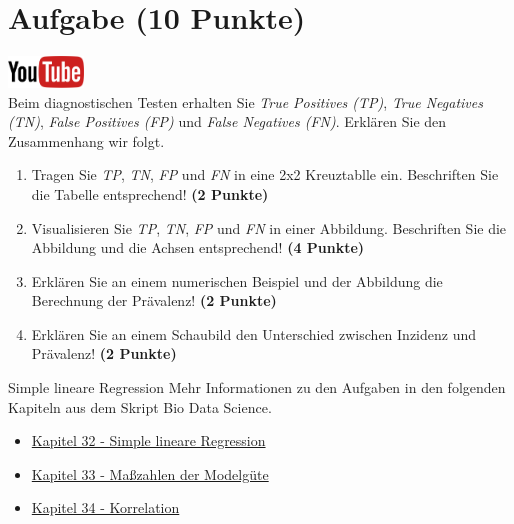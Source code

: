\documentclass[a4paper, 10pt]{scrartcl}\usepackage[]{graphicx}\usepackage[]{xcolor}
\begin{document}
 
\clearpage

\section{Aufgabe \hfill (10 Punkte)}

\hfill\href{https://youtu.be/G-_r2KplGTI}{\includegraphics[width =
  2cm]{img/youtube}}\\[1Ex]


Beim diagnostischen Testen erhalten Sie \textit{True Positives (TP)},
\textit{True Negatives (TN)}, \textit{False Positives (FP)} und
\textit{False Negatives (FN)}. Erkl{\"a}ren Sie den Zusammenhang wir folgt.

\begin{enumerate}
\item Tragen Sie \textit{TP}, \textit{TN}, \textit{FP} und \textit{FN} in
  eine 2x2 Kreuztablle ein. Beschriften Sie die Tabelle entsprechend!
  \textbf{(2 Punkte)}
\item Visualisieren Sie \textit{TP}, \textit{TN}, \textit{FP} und
  \textit{FN} in einer Abbildung. Beschriften Sie die Abbildung und die
  Achsen entsprechend! \textbf{(4 Punkte)}
\item Erkl{\"a}ren Sie an einem numerischen Beispiel und der Abbildung die
  Berechnung der Pr{\"a}valenz!  \textbf{(2 Punkte)}
\item Erkl{\"a}ren Sie an einem Schaubild den Unterschied zwischen Inzidenz und
  Pr{\"a}valenz!  \textbf{(2 Punkte)}
\end{enumerate}





 
\clearpage
\begin{graybox}{Simple lineare Regression}
Mehr Informationen zu den Aufgaben in den folgenden Kapiteln aus dem Skript Bio Data Science.
  \begin{itemize}
  \item \href{https://jkruppa.github.io/stat-linear-reg-basic.html}{Kapitel 32 - Simple lineare Regression}
  \item \href{https://jkruppa.github.io/stat-linear-reg-quality.html}{Kapitel 33 - Maßzahlen der Modelgüte}
  \item \href{https://jkruppa.github.io/stat-linear-reg-corr.html}{Kapitel 34 - Korrelation}
  \end{itemize}
\end{graybox}
\clearpage
\end{document}
